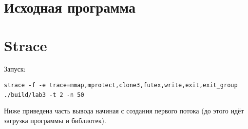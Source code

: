 \section{Исходная программа}

\begin{center}

\end{center}

\begin{center}

\end{center}

\begin{center}

\end{center}

\begin{center}

\end{center}

\begin{center}

\end{center}

\begin{center}

\end{center}

\begin{center}

\end{center}

\begin{center}

\end{center}

\section{Strace}
Запуск:
\begin{lstlisting}[language={}]
strace -f -e trace=mmap,mprotect,clone3,futex,write,exit,exit_group ./build/lab3 -t 2 -n 50
\end{lstlisting}
Ниже приведена часть вывода начиная с создания первого потока (до этого идёт загрузка программы и библиотек).

